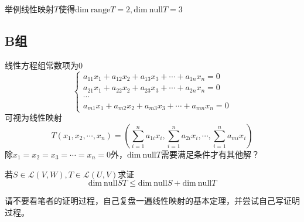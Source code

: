 \begin{reidai}
	举例线性映射$T$使得$\text{dim}~\text{range}T=2,\text{dim}~\text{null}T=3$
\end{reidai}

\subsection{B组}

\begin{reidai}
	线性方程组常数项为0
	$$\left\{\begin{matrix} 
		a_{11}x_1+a_{12}x_2+a_{13}x_3+\cdots+a_{1n}x_n=0 \\  
		a_{21}x_1+a_{22}x_2+a_{23}x_3+\cdots+a_{2n}x_n=0 \\
		\cdots \\
		a_{m1}x_1+a_{m2}x_2+a_{m3}x_3+\cdots+a_{mn}x_n=0
	\end{matrix}\right. $$可视为线性映射$$T(x_1,x_2,\cdots,x_n)=\left( \sum_{i=1}^{n}a_{1i}x_i,\sum_{i=1}^{n}a_{2i}x_i,\cdots,\sum_{i=1}^{n}a_{mi}x_i \right)$$
	除$x_1=x_2=x_3=\cdots=x_n=0$外，$\text{dim}~\text{null}T$需要满足条件才有其他解？
\end{reidai}

\begin{reidai}
	若$S\in\mathcal{L}(V,W),T\in\mathcal{L}(U,V)$求证$$\text{dim}~\text{null}ST\le \text{dim}~\text{null}S+\text{dim}~\text{null}T$$
\end{reidai}

\begin{reidai}
	请不要看笔者的证明过程，自己复盘一遍线性映射的基本定理，并尝试自己写证明过程。
\end{reidai}

